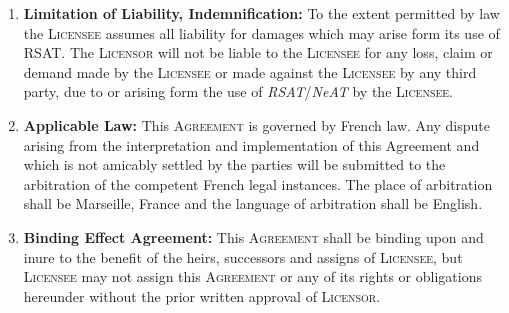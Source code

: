 \documentclass[12pt]{article}
\newcommand{\RSAT}[0]{\emph{RSAT}\xspace}
\newcommand{\NeAT}[0]{\emph{NeAT}\xspace}
\newcommand{\Licensor}[0]{\textsc{Licensor}\xspace}
\newcommand{\Licensee}[0]{\textsc{Licensee}\xspace}
\newcommand{\Agreement}[0]{\textsc{Agreement}\xspace}
\newcommand{\Paragraph}[2]{\item \textbf{#1:} #2}
\begin{document}
\begin{enumerate}
  \Paragraph{Limitation of Liability, Indemnification}{
    To the extent permitted by law the \Licensee assumes all liability for
    damages which may arise form its use of RSAT. The \Licensor will not
    be liable to the \Licensee for any loss, claim or demand made by the
    \Licensee or made against the \Licensee by any third party, due to or
    arising form the use of \RSAT/\NeAT by the \Licensee.

  }

  \Paragraph{Applicable Law}{This \Agreement is governed by French law. Any
    dispute arising from the interpretation and implementation of this
    Agreement and which is not amicably settled by the parties will be
    submitted to the arbitration of the competent French legal
    instances. The place of arbitration shall be Marseille, France and
    the language of arbitration shall be English.

  }

  \Paragraph{Binding Effect Agreement}{This \Agreement shall be
    binding upon and inure to the benefit of the heirs, successors and
    assigns of \Licensee, but \Licensee may not assign this \Agreement
    or any of its rights or obligations hereunder without the prior
    written approval of \Licensor.  }


\end{enumerate}
\end{document}
